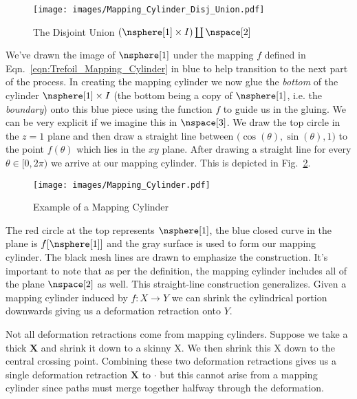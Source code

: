 \documentclass{book}                                                           %
\begin{document}
                \begin{figure}
                    \centering
                    \captionsetup{type=figure}
                    \texttt{[image: images/Mapping\_Cylinder\_Disj\_Union.pdf]}
                    \caption{The Disjoint Union
                             $(\nsphere[1]\times{I})\coprod\nspace[2]$}
                    \label{fig:Ex_Mapping_Cylinder_Disj_Union}
                \end{figure}
                We've drawn the image of $\nsphere[1]$ under the mapping $f$
                defined in Eqn.~\ref{eqn:Trefoil_Mapping_Cylinder} in blue to
                help transition to the next part of the process. In creating the
                mapping cylinder we now glue the \textit{bottom} of the cylinder
                $\nsphere[1]\times{I}$ (the bottom being a copy of
                $\nsphere[1]$, i.e. the \textit{boundary}) onto this blue piece
                using the function $f$ to guide us in the gluing. We can be very
                explicit if we imagine this in $\nspace[3]$. We draw the top
                circle in the $z=1$ plane and then draw a straight line between
                $\big(\cos(\theta),\sin(\theta),1\big)$ to the point $f(\theta)$
                which lies in the $xy$ plane. After drawing a straight line for
                every $\theta\in[0,2\pi)$ we arrive at our mapping cylinder.
                This is depicted in Fig.~\ref{fig:Ex_Mapping_Cylinder}.
                \begin{figure}[H]
                    \centering
                    \captionsetup{type=figure}
                    \texttt{[image: images/Mapping\_Cylinder.pdf]}
                    \caption{Example of a Mapping Cylinder}
                    \label{fig:Ex_Mapping_Cylinder}
                \end{figure}
                The red circle at the top represents $\nsphere[1]$, the blue
                closed curve in the plane is $f[\nsphere[1]]$ and the gray
                surface is used to form our mapping cylinder. The black mesh
                lines are drawn to emphasize the construction. It's important to
                note that as per the definition, the mapping cylinder includes
                all of the plane $\nspace[2]$ as well. This straight-line
                construction generalizes. Given a mapping cylinder induced by
                $f:X\rightarrow{Y}$ we can shrink the cylindrical portion
                downwards giving us a deformation retraction onto $Y$.
                \par\hfill\par
                Not all deformation retractions come from mapping cylinders.
                Suppose we take a thick $\textbf{X}$ and shrink it down to a
                skinny X. We then shrink this X down to the central crossing
                point. Combining these two deformation retractions gives us a
                single deformation retraction $\textbf{X}$ to $\cdot$ but this
                cannot arise from a mapping cylinder since paths must merge
                together halfway through the deformation.
\end{document}
